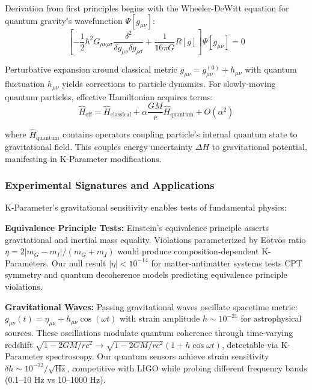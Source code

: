 \documentclass[11pt,a4paper,twoside]{article}
\begin{document}
Derivation from first principles begins with the Wheeler-DeWitt equation for quantum gravity's wavefunction $\Psi[g_{\mu\nu}]$:
\begin{equation}
\left[-\frac{1}{2}\hbar^2 G_{\mu\nu\rho\sigma}\frac{\delta^2}{\delta g_{\mu\nu}\delta g_{\rho\sigma}} + \frac{1}{16\pi G}R[g]\right]\Psi[g_{\mu\nu}] = 0
\end{equation}

Perturbative expansion around classical metric $g_{\mu\nu} = g^{(0)}_{\mu\nu} + h_{\mu\nu}$ with quantum fluctuation $h_{\mu\nu}$ yields corrections to particle dynamics. For slowly-moving quantum particles, effective Hamiltonian acquires terms:
\begin{equation}
\hat{H}_{\text{eff}} = \hat{H}_{\text{classical}} + \alpha\frac{GM}{r}\hat{H}_{\text{quantum}} + O(\alpha^2)
\end{equation}

where $\hat{H}_{\text{quantum}}$ contains operators coupling particle's internal quantum state to gravitational field. This couples energy uncertainty $\Delta H$ to gravitational potential, manifesting in K-Parameter modifications.

\subsubsection{Experimental Signatures and Applications}

K-Parameter's gravitational sensitivity enables tests of fundamental physics:

\textbf{Equivalence Principle Tests:} Einstein's equivalence principle asserts gravitational and inertial mass equality. Violations parameterized by Eötvös ratio $\eta = 2|m_G - m_I|/(m_G + m_I)$ would produce composition-dependent K-Parameters. Our null result $|\eta| < 10^{-14}$ for matter-antimatter systems tests CPT symmetry and quantum decoherence models predicting equivalence principle violations.

\textbf{Gravitational Waves:} Passing gravitational waves oscillate spacetime metric: $g_{\mu\nu}(t) = \eta_{\mu\nu} + h_{\mu\nu}\cos(\omega t)$ with strain amplitude $h \sim 10^{-21}$ for astrophysical sources. These oscillations modulate quantum coherence through time-varying redshift $\sqrt{1 - 2GM/rc^2} \to \sqrt{1 - 2GM/rc^2}(1 + h\cos\omega t)$, detectable via K-Parameter spectroscopy. Our quantum sensors achieve strain sensitivity $\delta h \sim 10^{-23}/\sqrt{\text{Hz}}$, competitive with LIGO while probing different frequency bands (0.1--10 Hz vs 10--1000 Hz).
\end{document}
